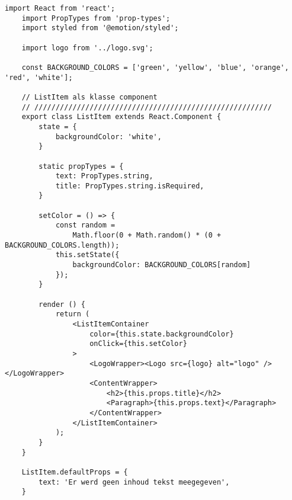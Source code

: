 \newpage
\begin{lstlisting}[caption=Statefull klasse component, label={fig:classCompWithProps&State}]
    import React from 'react';
    import PropTypes from 'prop-types';
    import styled from '@emotion/styled';
    
    import logo from '../logo.svg';
    
    const BACKGROUND_COLORS = ['green', 'yellow', 'blue', 'orange', 'red', 'white'];
    
    // ListItem als klasse component
    // ////////////////////////////////////////////////////////
    export class ListItem extends React.Component {
        state = {
            backgroundColor: 'white',
        }
        
        static propTypes = {
            text: PropTypes.string,
            title: PropTypes.string.isRequired,
        }
        
        setColor = () => {
            const random = 
                Math.floor(0 + Math.random() * (0 + BACKGROUND_COLORS.length));
            this.setState({
                backgroundColor: BACKGROUND_COLORS[random]
            });
        }
        
        render () {
            return (
                <ListItemContainer
                    color={this.state.backgroundColor} 
                    onClick={this.setColor}
                >
                    <LogoWrapper><Logo src={logo} alt="logo" /></LogoWrapper>
                    <ContentWrapper>
                        <h2>{this.props.title}</h2>
                        <Paragraph>{this.props.text}</Paragraph>
                    </ContentWrapper>
                </ListItemContainer>
            );
        }
    }
    
    ListItem.defaultProps = {
        text: 'Er werd geen inhoud tekst meegegeven',
    }
\end{lstlisting}

